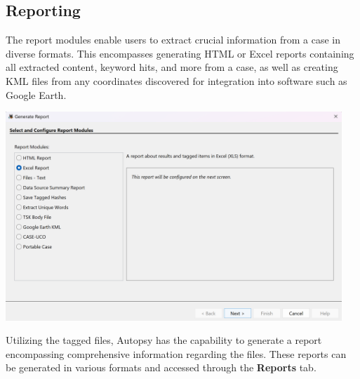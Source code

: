 \documentclass{article}
\begin{document}
\subsection{Reporting}
The report modules enable users to extract crucial information from a case in diverse formats. This encompasses generating HTML or Excel reports containing all extracted content, keyword hits, and more from a case, as well as creating KML files from any coordinates discovered for integration into software such as Google Earth.

\begin{center}
    \includegraphics[width=0.95\textwidth]{5/5.3/Report Generation-1 .png}
\end{center}

Utilizing the tagged files, Autopsy has the capability to generate a report encompassing comprehensive information regarding the files. These reports can be generated in various formats and accessed through the \textbf{Reports} tab.
\end{document}
